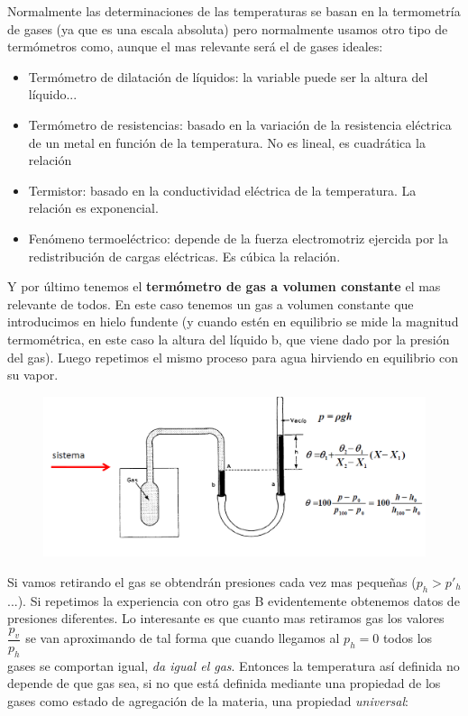 \documentclass[12pt,a4paper]{article}
\begin{document}
Normalmente las determinaciones de las temperaturas se basan en la termometría de gases (ya que es una escala absoluta) pero normalmente usamos otro tipo de termómetros como, aunque el mas relevante será el de gases ideales:

\begin{itemize}
\item Termómetro de dilatación de líquidos: la variable puede ser la altura del líquido...

\item Termómetro de resistencias: basado en la variación de la resistencia eléctrica de un metal en función de la temperatura. No es lineal, es cuadrática la relación

\item Termistor: basado en la conductividad eléctrica de la temperatura.  La relación es exponencial.

\item Fenómeno termoeléctrico: depende de la fuerza electromotriz ejercida por la redistribución de cargas eléctricas. Es cúbica la relación.
\end{itemize}

Y por último tenemos el \textbf{termómetro de gas a volumen constante} el mas relevante de todos. En este caso tenemos un gas a volumen constante que introducimos en hielo fundente (y cuando estén en equilibrio se mide la magnitud termométrica, en este caso la altura del líquido b, que viene dado por la presión del gas). Luego repetimos el mismo proceso para agua hirviendo en equilibrio con su vapor. \\

  \begin{figure}[t] \centering
\includegraphics[scale=0.75]{Gas-ideal.png}
\end{figure}

Si vamos retirando el gas se obtendrán presiones cada vez mas pequeñas ($p_h > p'_h$ ...). Si repetimos la experiencia con otro gas B evidentemente obtenemos datos de presiones diferentes. Lo interesante es que cuanto mas retiramos gas los valores $\dfrac{p_v}{p_h}$ se van aproximando de tal forma que cuando llegamos al $p_h = 0$ todos los gases se comportan igual, \textit{da igual el gas}. Entonces la temperatura así definida no depende de que gas sea, si no que está definida mediante una propiedad de los gases como estado de agregación de la materia, una propiedad \textit{universal}: 
\end{document}

